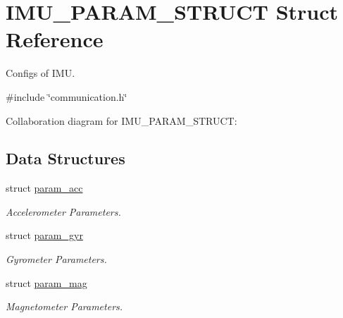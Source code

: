 \hypertarget{structIMU__PARAM__STRUCT}{
\section{IMU\_\-PARAM\_\-STRUCT Struct Reference}
\label{structIMU__PARAM__STRUCT}
}


Configs of IMU.  




{\ttfamily \#include \char`\"{}communication.h\char`\"{}}



Collaboration diagram for IMU\_\-PARAM\_\-STRUCT:\subsection*{Data Structures}
\begin{DoxyCompactItemize}
\item 
struct \hyperlink{structIMU__PARAM__STRUCT_1_1param__acc}{param\_\-acc}
\begin{DoxyCompactList}\small\item\em Accelerometer Parameters. \item\end{DoxyCompactList}\item 
struct \hyperlink{structIMU__PARAM__STRUCT_1_1param__gyr}{param\_\-gyr}
\begin{DoxyCompactList}\small\item\em Gyrometer Parameters. \item\end{DoxyCompactList}\item 
struct \hyperlink{structIMU__PARAM__STRUCT_1_1param__mag}{param\_\-mag}
\begin{DoxyCompactList}\small\item\em Magnetometer Parameters. \item\end{DoxyCompactList}\end{DoxyCompactItemize}
